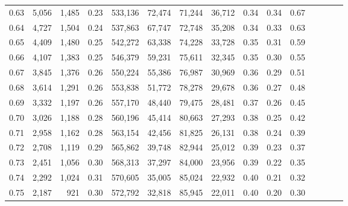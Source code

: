 \begin{tabular}{rrrcrrrrrrrrrrr}
0.63 &   5,056 &  1,485 &                                       0.23 &  533,136 &   72,474 &   71,244 &   36,712 &  0.34 &  0.34 &                         0.67 \\
0.64 &   4,727 &  1,504 &                                       0.24 &  537,863 &   67,747 &   72,748 &   35,208 &  0.34 &  0.33 &                         0.63 \\
0.65 &   4,409 &  1,480 &                                       0.25 &  542,272 &   63,338 &   74,228 &   33,728 &  0.35 &  0.31 &                         0.59 \\
0.66 &   4,107 &  1,383 &                                       0.25 &  546,379 &   59,231 &   75,611 &   32,345 &  0.35 &  0.30 &                         0.55 \\
0.67 &   3,845 &  1,376 &                                       0.26 &  550,224 &   55,386 &   76,987 &   30,969 &  0.36 &  0.29 &                         0.51 \\
0.68 &   3,614 &  1,291 &                                       0.26 &  553,838 &   51,772 &   78,278 &   29,678 &  0.36 &  0.27 &                         0.48 \\
0.69 &   3,332 &  1,197 &                                       0.26 &  557,170 &   48,440 &   79,475 &   28,481 &  0.37 &  0.26 &                         0.45 \\
0.70 &   3,026 &  1,188 &                                       0.28 &  560,196 &   45,414 &   80,663 &   27,293 &  0.38 &  0.25 &                         0.42 \\
0.71 &   2,958 &  1,162 &                                       0.28 &  563,154 &   42,456 &   81,825 &   26,131 &  0.38 &  0.24 &                         0.39 \\
0.72 &   2,708 &  1,119 &                                       0.29 &  565,862 &   39,748 &   82,944 &   25,012 &  0.39 &  0.23 &                         0.37 \\
0.73 &   2,451 &  1,056 &                                       0.30 &  568,313 &   37,297 &   84,000 &   23,956 &  0.39 &  0.22 &                         0.35 \\
0.74 &   2,292 &  1,024 &                                       0.31 &  570,605 &   35,005 &   85,024 &   22,932 &  0.40 &  0.21 &                         0.32 \\
0.75 &   2,187 &    921 &                                       0.30 &  572,792 &   32,818 &   85,945 &   22,011 &  0.40 &  0.20 &                         0.30 \\

\end{tabular}
